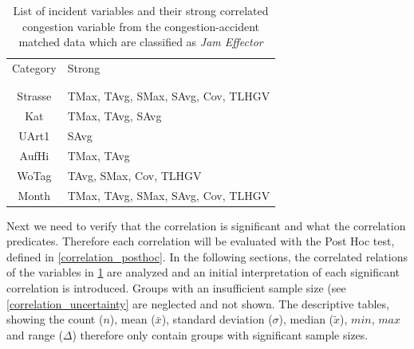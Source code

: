 \begin{table}[h!]
	\centering
	\begin{tabular}{c|l}  
		Category & Strong \\
		\\[-1em]
		\hline
		\\[-1em]
		Strasse & TMax, TAvg, SMax, SAvg, Cov, TLHGV \\ 
 		Kat & TMax, TAvg, SAvg \\ %
 		UArt1 & SAvg \\ %
 		AufHi & TMax, TAvg \\
 		WoTag & TAvg, SMax, Cov, TLHGV \\ %
 		Month & TMax, TAvg, SMax, SAvg, Cov, TLHGV \\ %
	\end{tabular}
    \caption{List of incident variables and their strong correlated congestion variable from the congestion-accident matched data which are classified as \textit{Jam Effector}}
	\label{tbl:correlation_list_baysis_effector}
\end{table}
Next we need to verify that the correlation is significant and what the correlation predicates. Therefore each correlation will be evaluated with the Post Hoc test, defined in \cref{correlation_posthoc}. In the following sections, the correlated relations of the variables in \cref{tbl:correlation_list_baysis_effector} are analyzed and an initial interpretation of each significant correlation is introduced. Groups with an insufficient sample size (see \cref{correlation_uncertainty} are neglected and not shown. The descriptive tables, showing the count ($n$), mean ($\bar{x}$), standard deviation ($\sigma$), median ($\tilde{x}$), $min$, $max$ and range ($\Delta$) therefore only contain groups with significant sample sizes.
